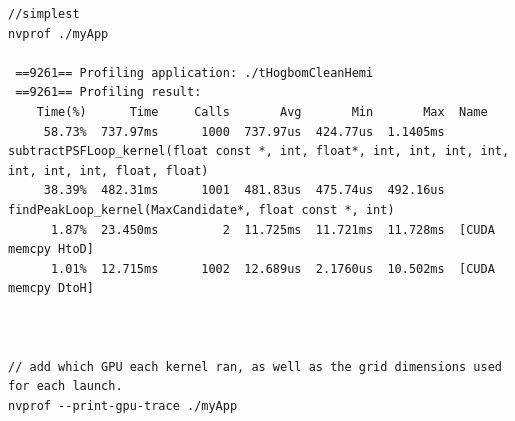 \begin{verbatim}
//simplest
nvprof ./myApp

 ==9261== Profiling application: ./tHogbomCleanHemi
 ==9261== Profiling result:
    Time(%)      Time     Calls       Avg       Min       Max  Name
     58.73%  737.97ms      1000  737.97us  424.77us  1.1405ms  subtractPSFLoop_kernel(float const *, int, float*, int, int, int, int, int, int, int, float, float)
     38.39%  482.31ms      1001  481.83us  475.74us  492.16us  findPeakLoop_kernel(MaxCandidate*, float const *, int)
      1.87%  23.450ms         2  11.725ms  11.721ms  11.728ms  [CUDA memcpy HtoD]
      1.01%  12.715ms      1002  12.689us  2.1760us  10.502ms  [CUDA memcpy DtoH]



// add which GPU each kernel ran, as well as the grid dimensions used for each launch.
nvprof --print-gpu-trace ./myApp


\end{verbatim}
